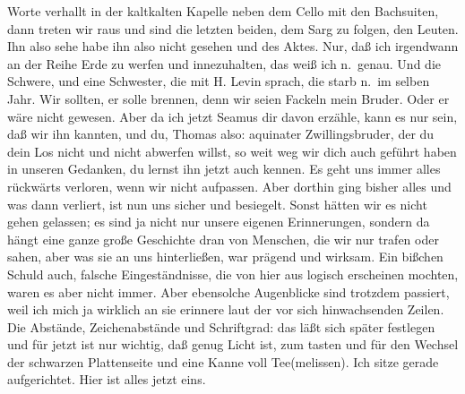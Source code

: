 \documentclass[
]{article}
\begin{document}
Worte verhallt in der kaltkalten Kapelle neben dem Cello mit den
Bachsuiten, dann treten wir raus und sind die letzten beiden, dem Sarg
zu folgen, den Leuten. Ihn also sehe habe ihn also nicht gesehen und des
Aktes. Nur, daß ich irgendwann an der Reihe Erde zu werfen und
innezuhalten, das weiß ich n.~genau. Und die Schwere, und eine
Schwester, die mit H. Levin sprach, die starb n.~im selben Jahr. Wir
sollten, er solle brennen, denn wir seien Fackeln mein Bruder. Oder er
wäre nicht gewesen. Aber da ich jetzt Seamus dir davon erzähle, kann es
nur sein, daß wir ihn kannten, und du, Thomas also: aquinater
Zwillingsbruder, der du dein Los nicht und nicht abwerfen willst, so
weit weg wir dich auch geführt haben in unseren Gedanken, du lernst ihn
jetzt auch kennen. Es geht uns immer alles rückwärts verloren, wenn wir
nicht aufpassen. Aber dorthin ging bisher alles und was dann verliert,
ist nun uns sicher und besiegelt. Sonst hätten wir es nicht gehen
gelassen; es sind ja nicht nur unsere eigenen Erinnerungen, sondern da
hängt eine ganze große Geschichte dran von Menschen, die wir nur trafen
oder sahen, aber was sie an uns hinterließen, war prägend und wirksam.
Ein bißchen Schuld auch, falsche Eingeständnisse, die von hier aus
logisch erscheinen mochten, waren es aber nicht immer. Aber ebensolche
Augenblicke sind trotzdem passiert, weil ich mich ja wirklich an sie
erinnere laut der vor sich hinwachsenden Zeilen. Die Abstände,
Zeichenabstände und Schriftgrad: das läßt sich später festlegen und für
jetzt ist nur wichtig, daß genug Licht ist, zum tasten und für den
Wechsel der schwarzen Plattenseite und eine Kanne voll Tee(melissen).
Ich sitze gerade aufgerichtet. Hier ist alles jetzt eins.
\end{document}
